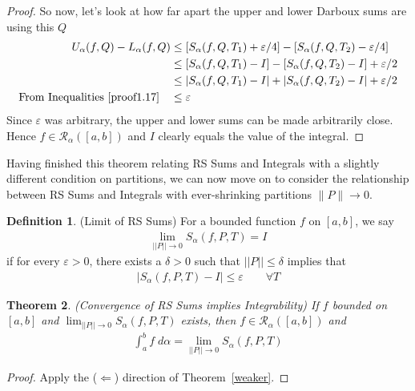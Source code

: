 \documentclass[12pt]{article}
\numberwithin{equation}{section} %
\theoremstyle{plain}
\newtheorem{thm}{Theorem}[section]
\theoremstyle{definition}
\newtheorem{defn}[thm]{Definition}
\theoremstyle{remark}
\newcommand{\ra}{\rightarrow}
\begin{document}
\begin{proof}
So now, let's look at how far apart the upper and lower Darboux sums are
using this $Q$
\begin{align*}
    U_\alpha(f,Q) - L_\alpha(f,Q) &\leq
        \left[ S_\alpha(f,Q,T_1) + \varepsilon/4\right] -
        \left[ S_\alpha(f,Q,T_2) - \varepsilon/4\right] \\
    &\leq
        \left[ S_\alpha(f,Q,T_1) - I\right] -
        \left[ S_\alpha(f,Q,T_2) - I \right]
        + \varepsilon/2
        \\
    &\leq \left\lvert S_\alpha(f,Q,T_1) - I \right\rvert+
        \left\lvert S_\alpha(f,Q,T_2) - I \right\rvert
        + \varepsilon/2 \\
    \text{From Inequalities \ref{proof1.17}} \quad
        &\leq \varepsilon
\end{align*}
Since $\varepsilon$ was arbitrary, the upper and lower sums can be made
arbitrarily close. Hence $f\in\mathscr{R}_\alpha([a,b])$ and $I$ clearly
equals the value of the integral.
\end{proof}

\clearpage
Having finished this theorem relating RS Sums and Integrals with a
slightly different condition on partitions,
we can now move on to consider the relationship between RS Sums and
Integrals with ever-shrinking partitions $\lVert P\rVert\ra0$.

\begin{defn}(Limit of RS Sums)
\label{strongest}
For a bounded function $f$ on $[a,b]$, we say
\begin{align*}
  \lim_{||P||\rightarrow 0} S_\alpha(f,P,T) = I
\end{align*}
if for every $\varepsilon>0$, there exists a $\delta>0$ such that
$||P||\leq\delta$ implies that
\begin{align*}
  |S_\alpha(f,P,T) - I | \leq \varepsilon \qquad \forall T
\end{align*}
\end{defn}

\begin{thm}\emph{(Convergence of RS Sums implies Integrability)}
\label{oneway}
If $f$ bounded on $[a,b]$ and
$\lim_{||P||\rightarrow 0}S_\alpha(f,P,T)$ exists, then
$f\in\mathscr{R}_\alpha([a,b])$ and
\begin{align}
  \int^b_a f\;d\alpha = \lim_{||P||\rightarrow 0}
    S_\alpha(f,P,T)
  \label{rssumequiv}
\end{align}
\end{thm}
\begin{proof}
Apply the ($\Leftarrow$) direction of Theorem~\ref{weaker}.
\end{proof}
\end{document}
